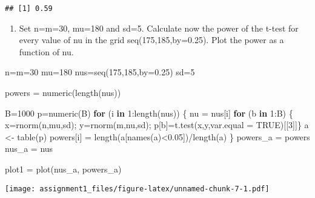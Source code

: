 \documentclass[
]{article}
\newenvironment{Shaded}{\begin{snugshade}}{\end{snugshade}}
\newcommand{\AttributeTok}[1]{\textcolor[rgb]{0.77,0.63,0.00}{#1}}
\newcommand{\ConstantTok}[1]{\textcolor[rgb]{0.00,0.00,0.00}{#1}}
\newcommand{\ControlFlowTok}[1]{\textcolor[rgb]{0.13,0.29,0.53}{\textbf{#1}}}
\newcommand{\DecValTok}[1]{\textcolor[rgb]{0.00,0.00,0.81}{#1}}
\newcommand{\FloatTok}[1]{\textcolor[rgb]{0.00,0.00,0.81}{#1}}
\newcommand{\FunctionTok}[1]{\textcolor[rgb]{0.00,0.00,0.00}{#1}}
\newcommand{\NormalTok}[1]{#1}
\newcommand{\OtherTok}[1]{\textcolor[rgb]{0.56,0.35,0.01}{#1}}
\newcommand{\SpecialCharTok}[1]{\textcolor[rgb]{0.00,0.00,0.00}{#1}}
\providecommand{\tightlist}{%
  \setlength{\itemsep}{0pt}\setlength{\parskip}{0pt}}
\begin{document}
\begin{verbatim}
## [1] 0.59
\end{verbatim}

\begin{enumerate}
\def\labelenumi{\alph{enumi})}
\tightlist
\item
  Set n=m=30, mu=180 and sd=5. Calculate now the power of the t-test for
  every value of nu in the grid seq(175,185,by=0.25). Plot the power as
  a function of nu.
\end{enumerate}

\begin{Shaded}
\begin{Highlighting}[]
\NormalTok{n}\OtherTok{=}\NormalTok{m}\OtherTok{=}\DecValTok{30}
\NormalTok{mu}\OtherTok{=}\DecValTok{180}
\NormalTok{nus}\OtherTok{=}\FunctionTok{seq}\NormalTok{(}\DecValTok{175}\NormalTok{,}\DecValTok{185}\NormalTok{,}\AttributeTok{by=}\FloatTok{0.25}\NormalTok{)}
\NormalTok{sd}\OtherTok{=}\DecValTok{5}

\NormalTok{powers }\OtherTok{=} \FunctionTok{numeric}\NormalTok{(}\FunctionTok{length}\NormalTok{(nus))}

\NormalTok{B}\OtherTok{=}\DecValTok{1000}
\NormalTok{p}\OtherTok{=}\FunctionTok{numeric}\NormalTok{(B)}
\ControlFlowTok{for}\NormalTok{ (i }\ControlFlowTok{in} \DecValTok{1}\SpecialCharTok{:}\FunctionTok{length}\NormalTok{(nus)) \{}
\NormalTok{  nu }\OtherTok{=}\NormalTok{ nus[i]}
  \ControlFlowTok{for}\NormalTok{ (b }\ControlFlowTok{in} \DecValTok{1}\SpecialCharTok{:}\NormalTok{B) \{}
\NormalTok{    x}\OtherTok{=}\FunctionTok{rnorm}\NormalTok{(n,mu,sd);}
\NormalTok{    y}\OtherTok{=}\FunctionTok{rnorm}\NormalTok{(m,nu,sd);}
\NormalTok{    p[b]}\OtherTok{=}\FunctionTok{t.test}\NormalTok{(x,y,}\AttributeTok{var.equal =} \ConstantTok{TRUE}\NormalTok{)[[}\DecValTok{3}\NormalTok{]]\}}
\NormalTok{  a }\OtherTok{\textless{}{-}} \FunctionTok{table}\NormalTok{(p)}
\NormalTok{  powers[i] }\OtherTok{=} \FunctionTok{length}\NormalTok{(a[}\FunctionTok{names}\NormalTok{(a)}\SpecialCharTok{\textless{}}\FloatTok{0.05}\NormalTok{])}\SpecialCharTok{/}\FunctionTok{length}\NormalTok{(a)}
\NormalTok{\} }
\NormalTok{powers\_a }\OtherTok{=}\NormalTok{ powers}
\NormalTok{nus\_a }\OtherTok{=}\NormalTok{ nus}

\NormalTok{plot1 }\OtherTok{=} \FunctionTok{plot}\NormalTok{(nus\_a, powers\_a)}
\end{Highlighting}
\end{Shaded}

\texttt{[image: assignment1\_files/figure-latex/unnamed-chunk-7-1.pdf]}
\end{document}

